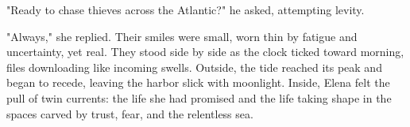 "Ready to chase thieves across the Atlantic?" he asked, attempting levity.

"Always," she replied. Their smiles were small, worn thin by fatigue and uncertainty, yet real. They stood side by side as the clock ticked toward morning, files downloading like incoming swells. Outside, the tide reached its peak and began to recede, leaving the harbor slick with moonlight. Inside, Elena felt the pull of twin currents: the life she had promised and the life taking shape in the spaces carved by trust, fear, and the relentless sea.

